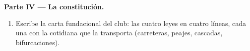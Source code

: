\begin{problem}
\medskip\noindent\textbf{Parte IV --- La constitución.}
\begin{enumerate}[resume]
  \item Escribe la carta fundacional del club: las cuatro leyes en
        cuatro líneas, cada una con la  cotidiana que la
        transporta (carreteras, peajes, cascadas, bifurcaciones).
\end{enumerate}
\end{problem}
